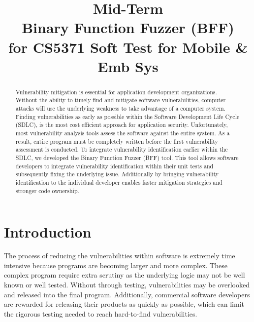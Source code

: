 \documentclass[conference]{IEEEtran}
\begin{document}
\title{Mid-Term\\
Binary Function Fuzzer (BFF) \\
for CS5371 Soft Test for Mobile \& Emb Sys}

\author{
}

\maketitle

\begin{abstract}
Vulnerability mitigation is essential for application development organizations. Without the ability to timely find and mitigate software vulnerabilities, computer attacks will use the underlying weakness to take advantage of a computer system. Finding vulnerabilities as early as possible within the Software Development Life Cycle (SDLC), is the most cost efficient approach for application security. Unfortunately, most vulnerability analysis tools assess the software against the entire system. As a result, entire program must be completely written before the first vulnerability assessment is conducted. To integrate vulnerability identification earlier within the SDLC, we developed the Binary Function Fuzzer (BFF) tool. This tool allows software developers to integrate vulnerability identification within their unit tests and subsequently fixing the underlying issue. Additionally by bringing vulnerability identification to the individual developer enables faster mitigation strategies and stronger code ownership. 
\end{abstract}

\IEEEpeerreviewmaketitle

\section{Introduction}
The process of reducing the vulnerabilities within software is extremely time intensive because programs are becoming larger and more complex. These complex program require extra scrutiny as the underlying logic may not be well known or well tested. Without through testing, vulnerabilities may be overlooked and released into the final program. Additionally, commercial software developers are rewarded for releasing their products as quickly as possible, which can limit the rigorous testing needed to reach hard-to-find vulnerabilities. 
\end{document}
